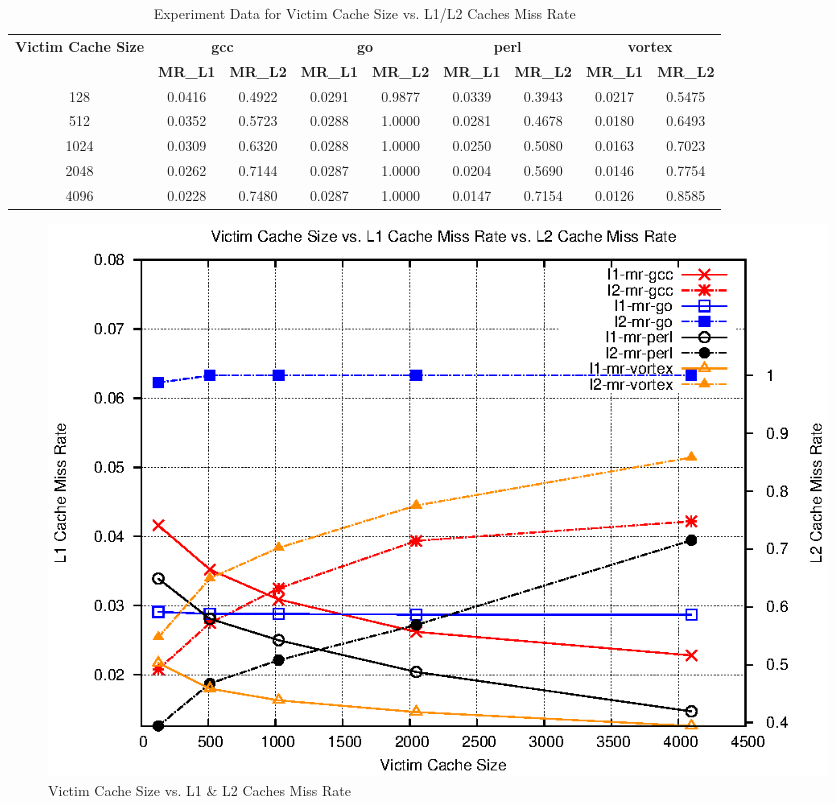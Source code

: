 \documentclass[a4paper]{article}
\begin{document}
\begin{table}[htbp]
    \centering
    \begin{tabular}{|c|c|c|c|c|c|c|c|c|}
        \hline
        \multirow{2}[4]{*}{\bf Victim Cache Size} & \multicolumn{2}{c|}{\bf gcc} & \multicolumn{2}{c|}{\bf go} & \multicolumn{2}{c|}{\bf perl} &\multicolumn{2}{c|}{\bf vortex}\\
        \cline{2-9} & \bf MR_{L1} & \bf MR_{L2} & \bf MR_{L1} & \bf MR_{L2} & \bf MR_{L1} & \bf MR_{L2} & \bf MR_{L1} & \bf MR_{L2} \\
        \hline
        128 & 0.0416 & 0.4922 & 0.0291 & 0.9877 & 0.0339 & 0.3943 & 0.0217 & 0.5475 \\
        512 &  0.0352 & 0.5723 & 0.0288 & 1.0000 & 0.0281 & 0.4678 & 0.0180 & 0.6493 \\
        1024 & 0.0309 & 0.6320 & 0.0288 & 1.0000 & 0.0250 & 0.5080 & 0.0163 & 0.7023 \\
        2048 & 0.0262 & 0.7144 & 0.0287 & 1.0000 & 0.0204 & 0.5690 & 0.0146 & 0.7754 \\
        4096 & 0.0228 & 0.7480 & 0.0287 & 1.0000 & 0.0147 & 0.7154 & 0.0126 & 0.8585 \\
        \hline
    \end{tabular}
    \captionsetup{justification=centering}
    \caption{Experiment Data for Victim Cache Size vs. L1/L2 Caches Miss Rate}
    \label{tab:vcmr_data}
\end{table}

\begin{figure}
    \centering
    \includegraphics[scale=1.32] {vc_l1l2_mr.eps}
    \captionsetup{justification=centering}
    \caption{Victim Cache Size vs. L1 \& L2 Caches Miss Rate}
    \label{fig:vcmr_graph}
\end{figure}
\end{document}
